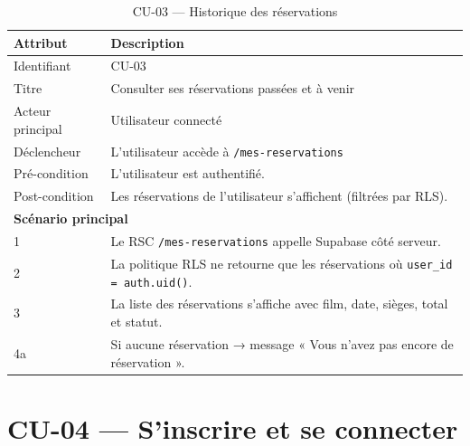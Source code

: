 \documentclass[12pt,a4paper,openany]{report}
\begin{document}
\begin{table}[H]
\centering
\begin{tabularx}{\textwidth}{lX}
\toprule
\textbf{Attribut} & \textbf{Description} \\
\midrule
Identifiant      & CU-03 \\
Titre            & Consulter ses réservations passées et à venir \\
Acteur principal & Utilisateur connecté \\
Déclencheur      & L'utilisateur accède à \texttt{/mes-reservations} \\
Pré-condition    & L'utilisateur est authentifié. \\
Post-condition   & Les réservations de l'utilisateur s'affichent (filtrées par RLS). \\
\midrule
\multicolumn{2}{l}{\textbf{Scénario principal}} \\
\midrule
1 & Le RSC \texttt{/mes-reservations} appelle Supabase côté serveur. \\
2 & La politique RLS ne retourne que les réservations où \texttt{user\_id = auth.uid()}. \\
3 & La liste des réservations s'affiche avec film, date, sièges, total et statut. \\
4a & Si aucune réservation → message « Vous n'avez pas encore de réservation ». \\
\bottomrule
\end{tabularx}
\caption{CU-03 — Historique des réservations}
\end{table}

\newpage
\section{CU-04 — S'inscrire et se connecter}
\end{document}
